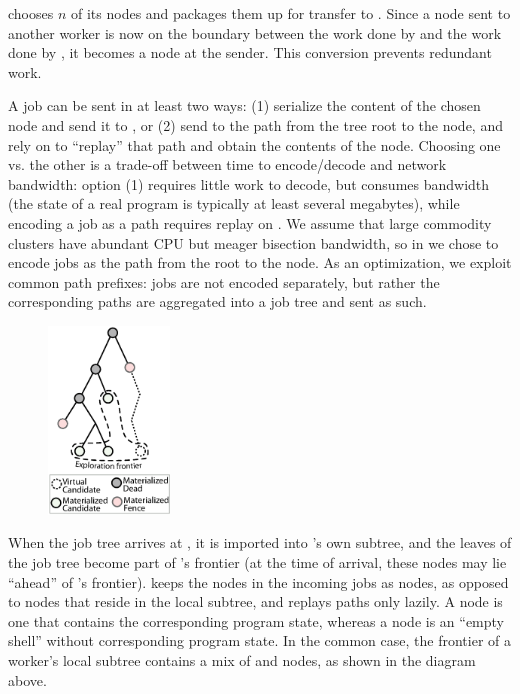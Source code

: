 \wsrc chooses $n$ of its \candidate nodes and packages them up for transfer to \wdst.  Since a \candidate node sent to another worker is now on the boundary between the work done by \wsrc and the work done by \wdst, it becomes a \fence node at the sender.  This conversion prevents redundant work.

A job can be sent in at least two ways: (1) serialize the content of the chosen node and send it to \wdst, or (2) send to \wdst the path from the tree root to the node, and rely on \wdst to ``replay'' that path and obtain the contents of the node.  Choosing one vs. the other is a trade-off between time to encode/decode and network bandwidth: option (1) requires little work to decode, but consumes bandwidth (the state of a real program is typically at least several megabytes), while encoding a job as a path requires replay on \wdst.  We assume that large commodity clusters have abundant CPU but meager bisection bandwidth,
so in \cnine we chose to encode jobs as the path from the root to the \candidate node.  As an optimization, we exploit common path prefixes: jobs are not encoded separately, but rather the corresponding paths are aggregated into a job tree and sent as such.

\begin{figure}
\vspace{-5mm}
%
\hspace{-10mm}\includegraphics[height=50mm]{figures/parsymbex/worker-tree-thumb}
\vspace{-8mm}
\end{figure}

When the job tree arrives at \wdst, it is imported into \wdst's own subtree, and the leaves of the job tree become part of \wdst's frontier (at the time of arrival, these nodes may lie ``ahead'' of \wdst's frontier).  \wdst keeps the nodes in the incoming jobs as {\em \virtual} nodes, as opposed to {\em \materialized} nodes that reside in the local subtree, and replays paths only lazily.  A \materialized node is one that contains the corresponding program state, whereas a \virtual node is an ``empty shell'' without corresponding program state.  In the common case, the frontier of a worker's local subtree contains a mix of \materialized and \virtual nodes, as shown in the diagram above.

